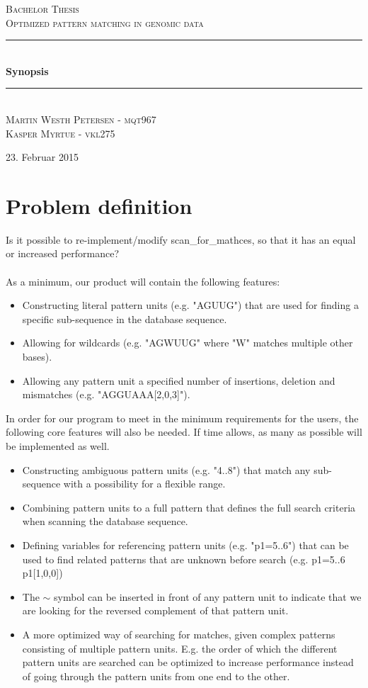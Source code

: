 \documentclass[12pt]{article}
\newcommand{\HRule}{\rule{\linewidth}{0.5mm}}
\begin{document}
\begin{titlepage}
\begin{center}

\textsc{\Large Bachelor Thesis \\ Optimized pattern matching in genomic data\\[0.3cm]}
\HRule \\[0.4cm]
{ \LARGE \bfseries Synopsis}\\[0.4cm]
\HRule \\[1.2cm]
\textsc{\large Martin Westh Petersen - mqt967 \\ Kasper Myrtue - vkl275}\\[1.0cm]
\end{center}
\begin{center}
\vfill
{\large 23. Februar 2015}
\end{center}
\end{titlepage}
\section{Problem definition}
Is it possible to re-implement/modify scan\_for\_mathces, so that it has an equal or
increased performance? \\ \\
As a minimum, our product will contain the following features:
\begin{itemize}
\item Constructing literal pattern units (e.g. "AGUUG") that are used for finding a specific sub-sequence in the 
database sequence.
\item Allowing for wildcards (e.g. "AGWUUG" where "W" matches multiple other bases).
\item Allowing any pattern unit a specified number of insertions, deletion and mismatches (e.g. "AGGUAAA[2,0,3]").
\end{itemize}
In order for our program to meet in the minimum requirements for the users, the following core features will also be needed.
If time allows, as many as possible will be implemented as well.
\begin{itemize}
\item Constructing ambiguous pattern units (e.g. "4..8") that match any sub-sequence with a possibility for a 
flexible range.
\item Combining pattern units to a full pattern that defines the full search criteria when scanning the database sequence.
\item Defining variables for referencing pattern units (e.g. "p1=5..6") that can be used 
to find related patterns that are unknown before search (e.g. p1=5..6 p1[1,0,0])
\item The $\sim$ symbol can be inserted in front of any pattern unit to indicate that we are looking for the reversed
complement of that pattern unit.
\item A more optimized way of searching for matches, given
complex patterns consisting of multiple pattern units. E.g. the order of which the different pattern units are searched
can be optimized to increase performance instead of going through the pattern units from one end to the other. 
\end{itemize}
\end{document}
